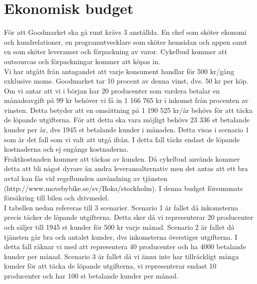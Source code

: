 \documentclass[10pt,a4paper,oneside]{article}
\begin{document}
\newpage

\section{Ekonomisk budget}
För att Goodmarket ska gå runt krävs 3 anställda. En chef som sköter ekonomi och kundrelationer, en programutvecklare som sköter hemsidan och appen samt en som sköter leveranser och förpackning av varor. Cykelbud kommer att outsourcas och förpackningar kommer att köpas in. \\

Vi har utgått från antagandet att varje konsument handlar för 500 kr/gång exklusive moms. Goodmarket tar 10 procent av denna vinst, dvs. 50 kr per köp. Om vi antar att vi i början har 20 producenter som vardera betalar en månadsavgift på 99 kr behöver vi få in 1 166 765 kr i inkomst från procenten av vinsten. Detta betyder att en omsättning på 1 190 525 kr/år behövs för att täcka de löpande utgifterna. För att detta ska vara möjligt behövs 23 336 st betalande kunder per år, dvs 1945 st betalande kunder i månaden. Detta visas i scenario 1 som är det fall som vi valt att utgå ifrån. I detta fall täcks endast de löpande kostnaderna och ej engångs kostnaderna. \\

Fraktkostnaden kommer att täckas av kunden. Då cykelbud används kommer detta att bli något dyrare än andra leveransalternativ men det antas att ett bra avtal kan fås vid regelbunden användning av tjänsten (http://www.movebybike.se/sv/Boka/stockholm). I denna budget försummats försäkring till bilen och drivmedel. \\

I tabellen nedan refereras till 3 scenarier. Scenario 1 är fallet då inkomsterna precis täcker de löpande utgifterna. Detta sker då vi representerar 20 producenter och säljer till 1945 st kunder för 500 kr varje månad. Scenario 2 är fallet då tjänsten går bra och antalet kunder, dvs inkomsterna överstiger utgifterna. I detta fall räknar vi med att representera 40 producenter och ha 4000 betalande kunder per månad. Scenario 3 är fallet då vi ännu inte har tillräckligt många kunder för att täcka de löpande utgifterna, vi representerar endast 10 producenter och har 100 st betalande kunder per månad. 

\newpage
\end{document}
